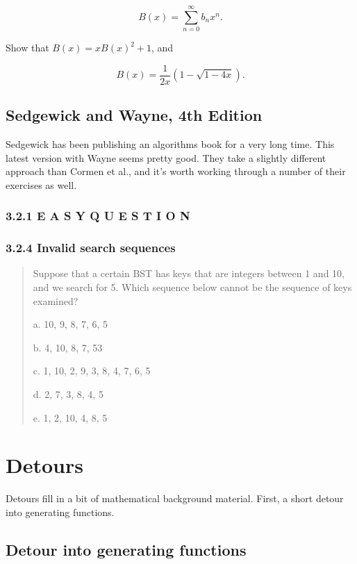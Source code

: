 \documentclass{article}
\begin{document}
\begin{equation}
B(x) = \sum_{n=0}^{\infty}b_nx^n.
\end{equation}

Show that $B(x) = xB(x)^2 + 1$, and

\begin{equation}
B(x) = \frac{1}{2x}(1-\sqrt{1-4x}).
\end{equation}


\subsection{Sedgewick and Wayne, 4th Edition}

Sedgewick has been publishing an algorithms book for a very long time.
This latest version with Wayne seems pretty good. They take a slightly
different approach than Cormen et al., and it's worth working through
a number of their exercises as well.

\subsubsection{3.2.1 E A S Y Q U E S T I O N}



\subsubsection{3.2.4 Invalid search sequences}

\begin{quote}
Suppose that a certain BST has keys that are integers between 1 and 10, and we
search for 5. Which sequence below cannot be the sequence of keys examined?

a. 10, 9, 8, 7, 6, 5

b. 4, 10, 8, 7, 53

c. 1, 10, 2, 9, 3, 8, 4, 7, 6, 5

d. 2, 7, 3, 8, 4, 5

e. 1, 2, 10, 4, 8, 5
\end{quote}

\section{Detours}

Detours fill in a bit of mathematical background material.
First, a short detour into generating functions.

\subsection{Detour into generating functions}
\end{document}
